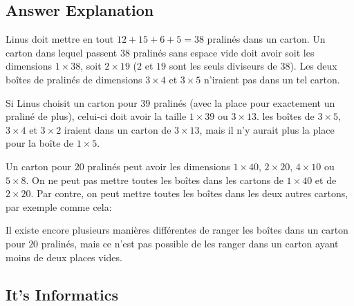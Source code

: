 \documentclass[a4paper,11pt]{report}
\newcommand{\taskGraphicsFolder}{..}
\begin{document}
\endgroup

\subsection*{Answer Explanation}

Linus doit mettre en tout ${12 + 15 + 6 + 5 = 38}$ pralinés dans un carton. Un carton dans lequel passent $38$ pralinés sans espace vide doit avoir soit les dimensions ${1 \times 38}$, soit ${2 \times 19}$ ($2$ et $19$ sont les seuls diviseurs de $38$). Les deux boîtes de pralinés de dimensions ${3 \times 4}$ et ${3 \times 5}$ n’iraient pas dans un tel carton.

{\centering%
\par}

Si Linus choisit un carton pour $39$ pralinés (avec la place pour exactement un praliné de plus), celui-ci doit avoir la taille ${1 \times 39}$ ou ${3 \times 13}$. les boîtes de ${3 \times 5}$, ${3 \times 4}$ et ${3 \times 2}$ iraient dans un carton de ${3 \times 13}$, mais il n’y aurait plus la place pour la boîte de ${1 \times 5}$.

{\centering%
\par}

Un carton pour $20$ pralinés peut avoir les dimensions ${1 \times 40}$, ${2 \times 20}$, ${4 \times 10}$ ou ${5 \times 8}$. On ne peut pas mettre toutes les boîtes dans les cartons de ${1 \times 40}$ et de ${2 \times 20}$. Par contre, on peut mettre toutes les boîtes dans les deux autres cartons, par exemple comme cela:

{\centering%
\raisebox{-0.5ex}{} \raisebox{-0.5ex}{}\par}

Il existe encore plusieurs manières différentes de ranger les boîtes dans un carton pour $20$ pralinés, mais ce n’est pas possible de les ranger dans un carton ayant moins de deux places vides.


\subsection*{It’s Informatics}
\end{document}
